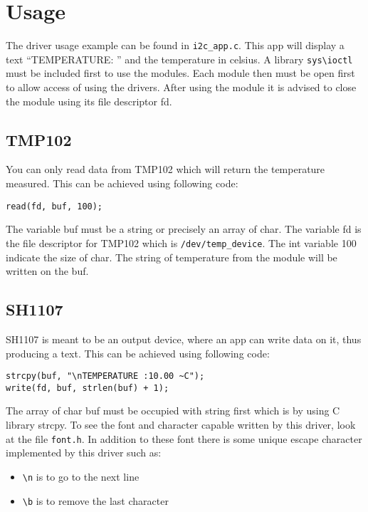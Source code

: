 \chapter{Usage}
The driver usage example can be found in \verb'i2c_app.c'. This app will display a text ``TEMPERATURE: '' and the temperature in celsius. A library \verb'sys\ioctl' must be included first to use the modules. Each module then must be open first to allow access of using the drivers. After using the module it is advised to close the module using its file descriptor fd.

\section{TMP102}
You can only read data from TMP102 which will return the temperature measured. This can be achieved using following code:

\begin{lstlisting}
read(fd, buf, 100);
\end{lstlisting}

The variable buf must be a string or precisely an array of char. The variable fd is the file descriptor for TMP102 which is \verb'/dev/temp_device'. The int variable 100 indicate the size of char. The string of temperature from the module will be written on the buf.

\section{SH1107}
SH1107 is meant to be an output device, where an app can write data on it, thus producing a text. This can be achieved using following code:

\begin{lstlisting}
strcpy(buf, "\nTEMPERATURE :10.00 ~C");
write(fd, buf, strlen(buf) + 1);
\end{lstlisting}

The array of char buf must be occupied with string first which is by using C library strcpy. To see the font and character capable written by this driver, look at the file \verb'font.h'. In addition to these font there is some unique escape character implemented by this driver such as:

\begin{itemize}
\item \verb'\n' is to go to the next line
\item \verb'\b' is to remove the last character
\end{itemize}